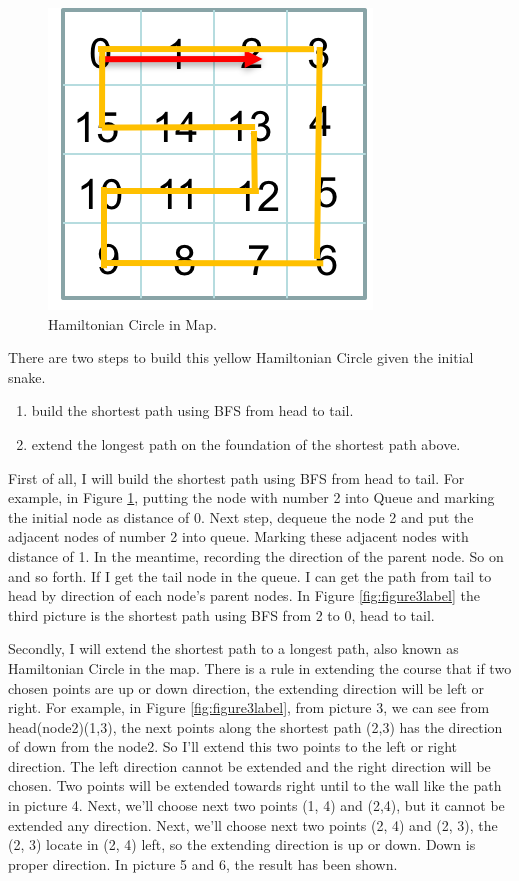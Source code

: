 \documentclass[12pt]{article}
\begin{document}
\begin{figure}[H]
\centering 
\includegraphics[scale = 0.8]{Picture1.png}
\caption{Hamiltonian Circle in Map.}
\label{fig:figure2label}
\end{figure}

There are two steps to build this yellow Hamiltonian Circle given the initial snake.
\begin{enumerate}
    \item build the shortest path using BFS from head to tail. 
    \item extend the longest path on the foundation of the shortest path above.
\end{enumerate}

First of all, I will build the shortest path using BFS from head to tail. For example, in Figure \ref{fig:figure2label}, putting the node with number 2 into Queue and marking the initial node as distance of 0. Next step, dequeue the node 2 and put the adjacent nodes of number 2 into queue. Marking these adjacent nodes with distance of 1. In the meantime, recording the direction of the parent node. So on and so forth. If I get the tail node in the queue. I can get the path from tail to head by direction of each node's parent nodes. In Figure \ref{fig:figure3label} the third picture is the shortest path using BFS from 2 to 0, head to tail.

Secondly, I will extend the shortest path to a longest path, also known as Hamiltonian Circle in the map. There is a rule in extending the course that if two chosen points are up or down direction, the extending direction will be left or right. For example, in Figure \ref{fig:figure3label}, from picture 3, we can see from head(node2)(1,3), the next points along the shortest path (2,3) has the direction of down from the node2. So I'll extend this two points to the left or right direction. The left direction cannot be extended and the right direction will be chosen. Two points will be extended towards right until to the wall like the path in picture 4. Next, we'll choose next two points (1, 4) and (2,4), but it cannot be extended any direction. Next, we'll choose next two points (2, 4) and (2, 3), the (2, 3) locate in (2, 4) left, so the extending direction is up or down. Down is proper direction. In picture 5 and 6, the result has been shown.
\end{document}
